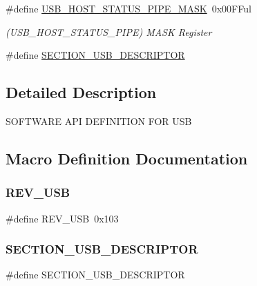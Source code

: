\begin{DoxyCompactItemize}
$$\item 
\#define \mbox{\hyperlink{group___s_a_m_d21___u_s_b_ga10314511f58df955f60ce4ab0180d2f1}{U\+S\+B\+\_\+\+H\+O\+S\+T\+\_\+\+S\+T\+A\+T\+U\+S\+\_\+\+P\+I\+P\+E\+\_\+\+M\+A\+SK}}~0x00\+F\+Ful
\begin{DoxyCompactList}\small\item\em (U\+S\+B\+\_\+\+H\+O\+S\+T\+\_\+\+S\+T\+A\+T\+U\+S\+\_\+\+P\+I\+PE) M\+A\+SK Register \end{DoxyCompactList}\item 
\#define \mbox{\hyperlink{group___s_a_m_d21___u_s_b_gaba8ee58805668388863bc441ad2c9527}{S\+E\+C\+T\+I\+O\+N\+\_\+\+U\+S\+B\+\_\+\+D\+E\+S\+C\+R\+I\+P\+T\+OR}}
\end{DoxyCompactItemize}


\subsection{Detailed Description}
S\+O\+F\+T\+W\+A\+RE A\+PI D\+E\+F\+I\+N\+I\+T\+I\+ON F\+OR U\+SB 

\subsection{Macro Definition Documentation}
\mbox{\label{group___s_a_m_d21___u_s_b_ga8f52971c16574d99c80af26aa4f3ab6e}} 
\subsubsection{\texorpdfstring{REV\_USB}{REV\_USB}}
{\footnotesize\ttfamily \#define R\+E\+V\+\_\+\+U\+SB~0x103}

\mbox{\label{group___s_a_m_d21___u_s_b_gaba8ee58805668388863bc441ad2c9527}} 
\subsubsection{\texorpdfstring{SECTION\_USB\_DESCRIPTOR}{SECTION\_USB\_DESCRIPTOR}}
{\footnotesize\ttfamily \#define S\+E\+C\+T\+I\+O\+N\+\_\+\+U\+S\+B\+\_\+\+D\+E\+S\+C\+R\+I\+P\+T\+OR}

